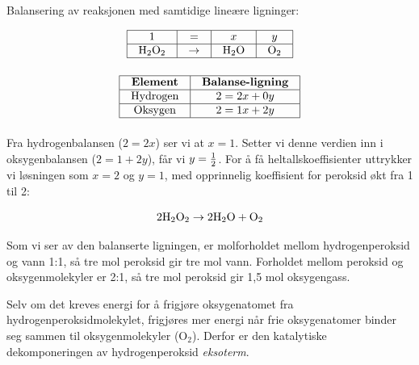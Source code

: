 Balansering av reaksjonen med samtidige lineære ligninger:


$$\vbox{\offinterlineskip
\halign{\strut
\vrule \quad\hfil # \ \hfil & 
\vrule \quad\hfil # \ \hfil & 
\vrule \quad\hfil # \ \hfil & 
\vrule \quad\hfil # \ \hfil \vrule \cr
\noalign{\hrule}
%
1 & = & $x$ & $y$ \cr
%
\noalign{\hrule}
%
H$_{2}$O$_{2}$ & $\to$ & H$_{2}$O & O$_{2}$ \cr
%
\noalign{\hrule}
} %
}$$ %


$$\vbox{\offinterlineskip
\halign{\strut
\vrule \quad\hfil # \ \hfil & 
\vrule \quad\hfil # \ \hfil \vrule \cr
\noalign{\hrule}
%
{\bf Element} & {\bf Balanse-ligning} \cr
%
\noalign{\hrule}
%
Hydrogen & $2 = 2x + 0y$ \cr
%
\noalign{\hrule}
%
Oksygen & $2 = 1x + 2y$ \cr
%
\noalign{\hrule}
} %
}$$ %

Fra hydrogenbalansen ($2 = 2x$) ser vi at $x = 1$. Setter vi denne verdien inn i oksygenbalansen ($2 = 1 + 2y$), får vi $y = {1 \over 2}$. For å få heltallskoeffisienter uttrykker vi løsningen som $x = 2$ og $y = 1$, med opprinnelig koeffisient for peroksid økt fra 1 til 2:

$$\hbox{2H}_2\hbox{O}_2 \to \hbox{2H}_2\hbox{O} + \hbox{O}_2$$

\vskip 10pt

Som vi ser av den balanserte ligningen, er molforholdet mellom hydrogenperoksid og vann 1:1, så tre mol peroksid gir tre mol vann. Forholdet mellom peroksid og oksygenmolekyler er 2:1, så tre mol peroksid gir 1,5 mol oksygengass.

\vskip 10pt

Selv om det kreves energi for å frigjøre oksygenatomet fra hydrogenperoksidmolekylet, frigjøres mer energi når frie oksygenatomer binder seg sammen til oksygenmolekyler (O$_{2}$). Derfor er den katalytiske dekomponeringen av hydrogenperoksid {\it eksoterm}.



